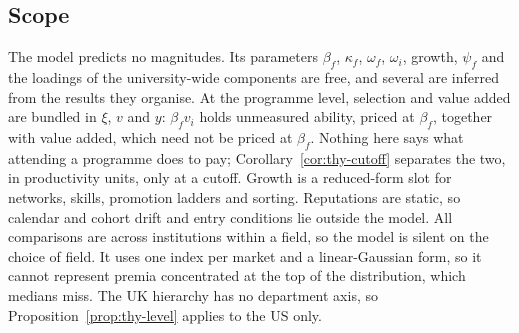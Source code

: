 \subsection{Scope}\label{app:thy:scope}

The model predicts no magnitudes. Its parameters $\beta_f$, $\kappa_f$, $\omega_f$, $\omega_i$, growth, $\psi_f$ and
the loadings of the university-wide components are free, and several are inferred from the results they organise.
At the programme level, selection and value added are bundled in $\xi$, $v$ and $y$: $\beta_fv_i$ holds
unmeasured ability, priced at $\beta_f$, together with value added, which need not be priced at $\beta_f$. Nothing
here says what attending a programme does to pay; Corollary~\ref{cor:thy-cutoff} separates the two, in productivity
units, only at a cutoff. Growth is a
reduced-form slot for networks, skills, promotion ladders and sorting. Reputations are static, so calendar and cohort
drift and entry conditions lie outside the model. All comparisons are across institutions within a field, so the
model is silent on the choice of field. It uses one index per market and a linear-Gaussian form, so it cannot
represent premia concentrated at the top of the distribution, which medians miss. The UK hierarchy has no department
axis, so Proposition~\ref{prop:thy-level} applies to the US only.

